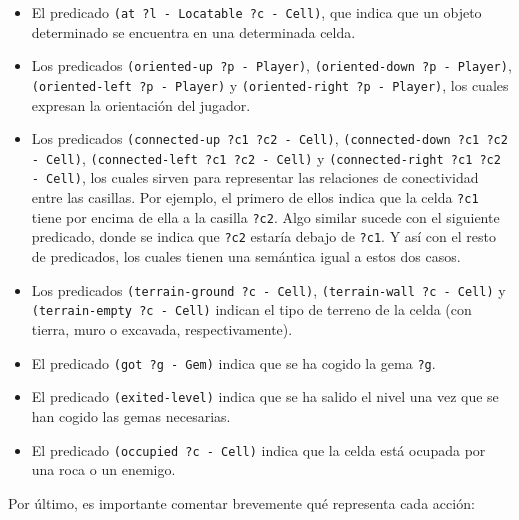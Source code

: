 \begin{itemize}[label=\textbullet]
    \item El predicado \texttt{(at ?l - Locatable ?c - Cell)}, que indica que un objeto determinado
    se encuentra en una determinada celda.
    \item Los predicados \texttt{(oriented-up ?p - Player)}, \texttt{(oriented-down ?p - Player)},
    \texttt{(oriented-left ?p - Player)} y \texttt{(oriented-right ?p - Player)}, los cuales expresan
    la orientación del jugador.
    \item Los predicados \texttt{(connected-up ?c1 ?c2 - Cell)}, \texttt{(connected-down ?c1 ?c2 - Cell)},
    \texttt{(connected-left ?c1 ?c2 - Cell)} y \texttt{(connected-right ?c1 ?c2 - Cell)}, los cuales sirven
    para representar las relaciones de conectividad entre las casillas. Por ejemplo, el primero de ellos indica
    que la celda \texttt{?c1} tiene por encima de ella a la casilla \texttt{?c2}. Algo similar sucede con el
    siguiente predicado, donde se indica que \texttt{?c2} estaría debajo de \texttt{?c1}. Y así con el resto
    de predicados, los cuales tienen una semántica igual a estos dos casos.
    \item Los predicados \texttt{(terrain-ground ?c - Cell)}, \texttt{(terrain-wall ?c - Cell)} y
    \texttt{(terrain-empty ?c - Cell)} indican el tipo de terreno de la celda (con tierra, muro o excavada,
    respectivamente).
    \item El predicado \texttt{(got ?g - Gem)} indica que se ha cogido la gema \texttt{?g}.
    \item El predicado \texttt{(exited-level)} indica que se ha salido el nivel una vez que se han cogido
    las gemas necesarias.
    \item El predicado \texttt{(occupied ?c - Cell)} indica que la celda está ocupada por una roca o un enemigo.
\end{itemize}

Por último, es importante comentar brevemente qué representa cada acción:

